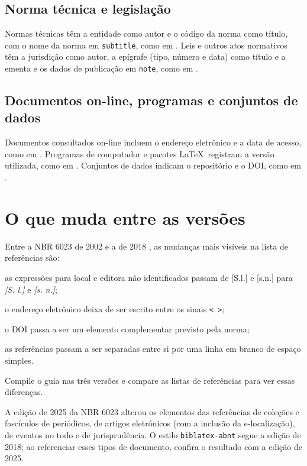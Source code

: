\subsection{Norma técnica e legislação}

Normas técnicas têm a entidade como autor e o código da norma como título, com o nome da norma em \texttt{subtitle}, como em . Leis e outros atos normativos têm a jurisdição como autor, a epígrafe (tipo, número e data) como título e a ementa e os dados de publicação em \texttt{note}, como em .

\subsection{Documentos on-line, programas e conjuntos de dados}

Documentos consultados on-line incluem o endereço eletrônico e a data de acesso, como em . Programas de computador e pacotes \LaTeX\ registram a versão utilizada, como em . Conjuntos de dados indicam o repositório e o DOI, como em .

\section{O que muda entre as versões}\label{sec:mudancas-referencias}

Entre a NBR 6023 de 2002 \cite{abnt6023-2002} e a de 2018 \cite{abnt6023}, as mudanças mais visíveis na lista de referências são:

\begin{alineas}
	\item as expressões para local e editora não identificados passam de [S.l.] e [s.n.] para \textit{[S. l.]} e \textit{[s. n.]};
	\item o endereço eletrônico deixa de ser escrito entre os sinais \texttt{< >};
	\item o DOI passa a ser um elemento complementar previsto pela norma;
	\item as referências passam a ser separadas entre si por uma linha em branco de espaço simples.
\end{alineas}

Compile o guia nas três versões e compare as listas de referências para ver essas diferenças.

A edição de 2025 da NBR 6023 \cite{abnt6023-2025} alterou os elementos das referências de coleções e fascículos de periódicos, de artigos eletrônicos (com a inclusão da e-localização), de eventos no todo e de jurisprudência. O estilo \texttt{biblatex-abnt} segue a edição de 2018; ao referenciar esses tipos de documento, confira o resultado com a edição de 2025.

